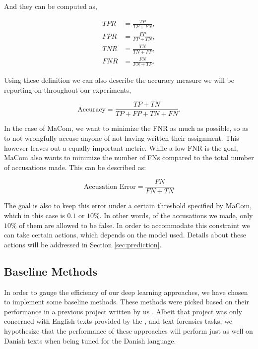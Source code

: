 And they can be computed as,

\begin{align}
    TPR &= \frac{TP}{TP + FN}, \\
    FPR &= \frac{FP}{FP + TN}, \\
    TNR &= \frac{TN}{TN + FP}, \\
    FNR &= \frac{FN}{FN + TP}.
\end{align}

Using these definition we can also describe the accuracy measure we will be
reporting on throughout our experiments,

\begin{equation}
    \text{Accuracy} = \frac{TP + TN}{TP + FP + TN + FN}.
\end{equation}


In the case of MaCom, we want to minimize the \gls{FNR} as much as possible,
so as to not wrongfully accuse anyone of not having written their assignment.
This however leaves out a equally important metric. While a low \gls{FNR} is the
goal, MaCom also wants to minimize the number of \gls{FN}s compared to the total
number of accusations made. This can be described as:

\begin{equation}
    \text{Accusation Error} = \frac{FN}{FN + TN}
\end{equation}

The goal is also to keep this error under a certain threshold specified by
MaCom, which in this case is $0.1$ or $10\%$. In other words, of the accusations
we made, only $10\%$ of them are allowed to be false. In order to accommodate
this constraint we can take certain actions, which depends on the model used.
Details about these actions will be addressed in Section \ref{sec:prediction}.

\subsection{Baseline Methods}

In order to gauge the efficiency of our deep learning approaches, we have chosen
to implement some baseline methods. These methods were picked based on their
performance in a previous project written by us \cite{US}. Albeit that project
was only concerned with English texts provided by the \cite{pan:2015}, and
\cite{pan:2014} text forensics tasks, we hypothesize that the performance of
these approaches will perform just as well on Danish texts when being tuned for
the Danish language.


